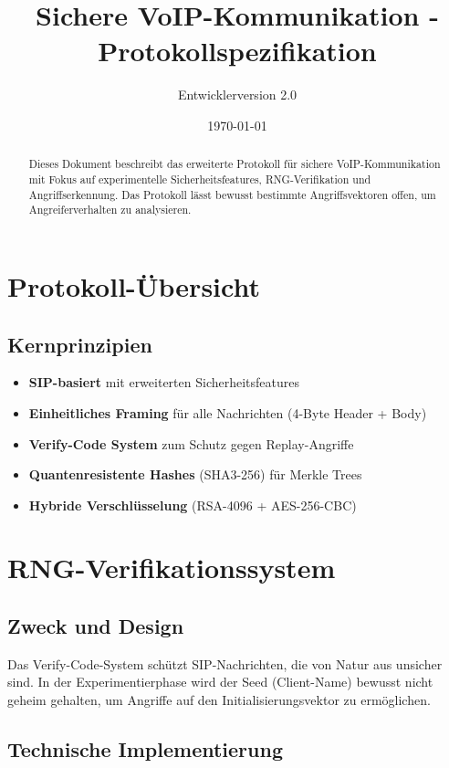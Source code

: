 \documentclass[10pt,a4paper]{article}
\title{Sichere VoIP-Kommunikation - Protokollspezifikation}
\author{Entwicklerversion 2.0}
\date{\today}
\begin{document}
\maketitle

\begin{abstract}
Dieses Dokument beschreibt das erweiterte Protokoll für sichere VoIP-Kommunikation mit Fokus auf experimentelle Sicherheitsfeatures, RNG-Verifikation und Angriffserkennung. Das Protokoll lässt bewusst bestimmte Angriffsvektoren offen, um Angreiferverhalten zu analysieren.
\end{abstract}

\tableofcontents

\section{Protokoll-Übersicht}

\subsection{Kernprinzipien}
\begin{itemize}
\item \textbf{SIP-basiert} mit erweiterten Sicherheitsfeatures
\item \textbf{Einheitliches Framing} für alle Nachrichten (4-Byte Header + Body)
\item \textbf{Verify-Code System} zum Schutz gegen Replay-Angriffe
\item \textbf{Quantenresistente Hashes} (SHA3-256) für Merkle Trees
\item \textbf{Hybride Verschlüsselung} (RSA-4096 + AES-256-CBC)
\end{itemize}

\section{RNG-Verifikationssystem}

\subsection{Zweck und Design}
Das Verify-Code-System schützt SIP-Nachrichten, die von Natur aus unsicher sind. In der Experimentierphase wird der Seed (Client-Name) bewusst nicht geheim gehalten, um Angriffe auf den Initialisierungsvektor zu ermöglichen.

\subsection{Technische Implementierung}
\end{document}
